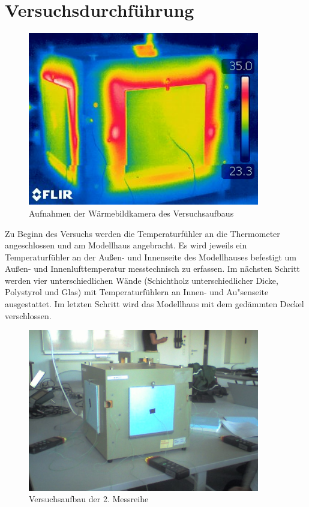 \section{Versuchsdurchführung}

\begin{figure}[H]
    \centering
    \includegraphics[width=0.9\textwidth]{Abbildungen/WBK_UWERT.jpg}
    \caption{Aufnahmen der Wärmebildkamera des Versuchsaufbaus}
    \label{fig:230715_WBK}
\end{figure}

Zu Beginn des Versuchs werden die Temperaturfühler an die Thermometer angeschlossen und am Modellhaus angebracht. 
Es wird jeweils ein Temperaturfühler an der Außen- und Innenseite des Modellhauses befestigt um Außen- und Innenlufttemperatur messtechnisch zu erfassen. Im nächsten Schritt werden vier unterschiedlichen Wände (Schichtholz unterschiedlicher Dicke, Polystyrol und Glas) mit Temperaturfühlern an Innen- und Au"senseite ausgestattet. Im letzten Schritt wird 
das Modellhaus mit dem gedämmten Deckel verschlossen.

\begin{figure}[H]
    \centering
    \includegraphics[width=0.9\textwidth]{Abbildungen/M2_Modellhaus.jpeg}
    \caption{Versuchsaufbau der 2. Messreihe}
    \label{fig:230715_M2}
\end{figure}

